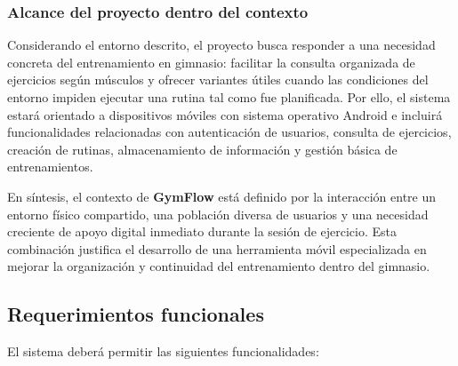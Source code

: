 \subsubsection{Alcance del proyecto dentro del contexto}

Considerando el entorno descrito, el proyecto busca responder a una necesidad concreta del entrenamiento en gimnasio: facilitar la consulta organizada de ejercicios según músculos y ofrecer variantes útiles cuando las condiciones del entorno impiden ejecutar una rutina tal como fue planificada. Por ello, el sistema estará orientado a dispositivos móviles con sistema operativo Android e incluirá funcionalidades relacionadas con autenticación de usuarios, consulta de ejercicios, creación de rutinas, almacenamiento de información y gestión básica de entrenamientos.

En síntesis, el contexto de \textbf{GymFlow} está definido por la interacción entre un entorno físico compartido, una población diversa de usuarios y una necesidad creciente de apoyo digital inmediato durante la sesión de ejercicio. Esta combinación justifica el desarrollo de una herramienta móvil especializada en mejorar la organización y continuidad del entrenamiento dentro del gimnasio.
\subsection{Requerimientos funcionales}

El sistema deberá permitir las siguientes funcionalidades:

